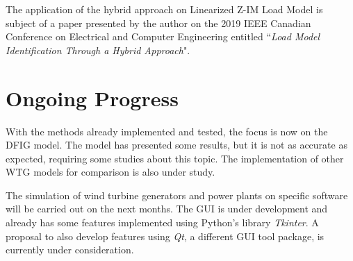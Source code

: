 The application of the hybrid approach on Linearized Z-IM Load Model is subject of a paper presented by the author on the 2019 IEEE Canadian Conference on Electrical and Computer Engineering entitled ``\textit{Load Model Identification Through a Hybrid Approach}".

\section{Ongoing Progress}

With the methods already implemented and tested, the focus is now on the DFIG model. The model has presented some results, but it is not as accurate as expected, requiring some studies about this topic. The implementation of other WTG models for comparison is also under study.

The simulation of wind turbine generators and power plants on specific software will be carried out on the next months. The GUI is under development and already has some features implemented using Python's library \textit{Tkinter}. A proposal to also develop features using \textit{Qt}, a different GUI tool package, is currently under consideration.